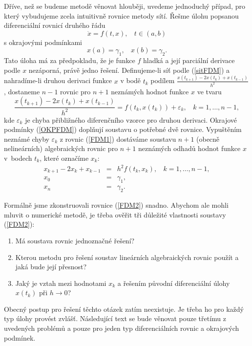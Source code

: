 \documentclass[a4paper, 12pt]{book}
\theoremstyle{definition}
\def\to{\rightarrow}
\begin{document}
Dříve, než se budeme metodě věnovat hlouběji, uvedeme jednoduchý případ, pro který 
vybudujeme zcela intuitivně rovnice metody sítí. Řešme úlohu popsanou diferenciální 
rovnicí druhého řádu
\begin{equation}\label{prikFDM}
\ddot x=f(t,x),~~~~ t\in(a,b)
\end{equation}
s okrajovými podmínkami
\begin{equation}\label{OKPFDM}
x(a)=\gamma_1,~~~~ x(b)=\gamma_2.
\end{equation}
Tato úloha má za předpokladu, že je funkce $f$ hladká a její parciální derivace podle 
$x$ nezáporná, právě jedno řešení. Definujeme-li síť podle (\ref{sitFDM}) a nahradíme-li
druhou derivaci funkce $x$ v bodě $t_k$ podílem $\frac{x(t_{k+1})-2x(t_k)+x(t_{k-1})}{h^2}$,
dostaneme $n-1$ rovnic pro $n+1$ neznámých hodnot funkce $x$ ve tvaru
\begin{equation}\label{FDM1}
\frac{x(t_{k+1})-2x(t_k)+x(t_{k-1})}{h^2}=f(t_k,x(t_k))+\varepsilon_k,~~~~k=1,\dots,n-1,
\end{equation}
kde $\varepsilon_k$ je chyba přibližného diferenčního vzorce pro druhou derivaci.
Okrajové podmínky (\ref{OKPFDM}) doplňují soustavu o potřebné dvě rovnice. Vypuštěním
neznámé chyby $\varepsilon_k$ z rovnic (\ref{FDM1}) dostáváme soustavu $n+1$ (obecně
nelineárních) algebraických rovnic pro $n+1$ neznámých odhadů hodnot funkce $x$ 
v~bodech $t_k$, které označíme $x_k$:
\begin{equation}\label{FDM2}
\begin{array}{rcl}
x_{k+1}-2x_k+x_{k-1}&=&h^2 f(t_k,x_k),~~~~k=1,\dots,n-1,\\
x_0 &=&\gamma_1,\\
x_n &=&\gamma_2.
\end{array}
\end{equation}

Formálně jsme zkonstruovali rovnice (\ref{FDM2}) snadno. Abychom ale mohli mluvit
o numerické metodě, je třeba ověřit tři důležité vlastnosti soustavy (\ref{FDM2}):
\begin{enumerate}
\item Má soustava rovnic jednoznačné řešení?
\item Kterou metodu pro řešení soustav lineárních algebraických rovnic použít a jaká bude její přesnost?
\item Jaký je vztah mezi hodnotami $x_k$ a řešením původní diferenciální úlohy 
$x(t_k)$ při $h\to 0$?
\end{enumerate}
Obecný postup pro řešení těchto otázek zatím neexistuje. Je třeba ho pro každý typ úlohy 
provést zvlášť. Následující text se bude věnovat pouze třetímu z uvedených problémů a 
pouze pro jeden typ diferenciálních rovnic a okrajových podmínek.
\end{document}

